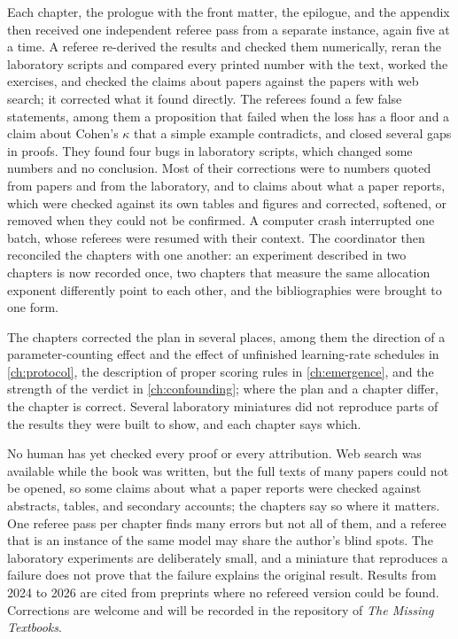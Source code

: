 Each chapter, the prologue with the front matter, the epilogue, and the appendix then received one independent referee pass from a separate instance, again five at a time. A referee re-derived the results and checked them numerically, reran the laboratory scripts and compared every printed number with the text, worked the exercises, and checked the claims about papers against the papers with web search; it corrected what it found directly. The referees found a few false statements, among them a proposition that failed when the loss has a floor and a claim about Cohen's $\kappa$ that a simple example contradicts, and closed several gaps in proofs. They found four bugs in laboratory scripts, which changed some numbers and no conclusion. Most of their corrections were to numbers quoted from papers and from the laboratory, and to claims about what a paper reports, which were checked against its own tables and figures and corrected, softened, or removed when they could not be confirmed. A computer crash interrupted one batch, whose referees were resumed with their context. The coordinator then reconciled the chapters with one another: an experiment described in two chapters is now recorded once, two chapters that measure the same allocation exponent differently point to each other, and the bibliographies were brought to one form.

The chapters corrected the plan in several places, among them the direction of a parameter-counting effect and the effect of unfinished learning-rate schedules in \cref{ch:protocol}, the description of proper scoring rules in \cref{ch:emergence}, and the strength of the verdict in \cref{ch:confounding}; where the plan and a chapter differ, the chapter is correct. Several laboratory miniatures did not reproduce parts of the results they were built to show, and each chapter says which.


No human has yet checked every proof or every attribution. Web search was available while the book was written, but the full texts of many papers could not be opened, so some claims about what a paper reports were checked against abstracts, tables, and secondary accounts; the chapters say so where it matters. One referee pass per chapter finds many errors but not all of them, and a referee that is an instance of the same model may share the author's blind spots. The laboratory experiments are deliberately small, and a miniature that reproduces a failure does not prove that the failure explains the original result. Results from 2024 to 2026 are cited from preprints where no refereed version could be found. Corrections are welcome and will be recorded in the repository of \emph{The Missing Textbooks}.

